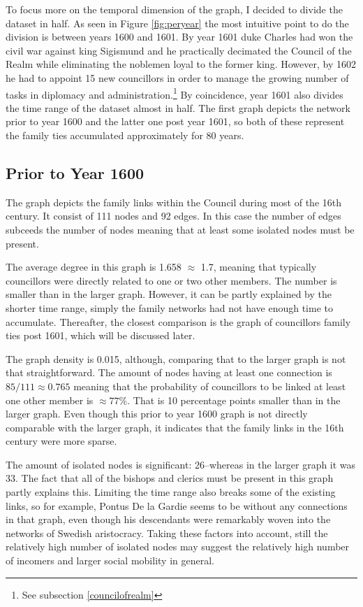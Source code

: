 To focus more on the temporal dimension of the graph, I decided to divide the dataset in half. As seen in Figure \ref{fig:peryear} the most intuitive point to do the division is between years 1600 and 1601. By year 1601 duke Charles had won the civil war against king Sigismund and he practically decimated the Council of the Realm while eliminating the noblemen loyal to the former king. However, by 1602 he had to appoint 15 new councillors in order to manage the growing number of tasks in diplomacy and administration.\footnote{See subsection \ref{councilofrealm}} By coincidence, year 1601 also divides the time range of the dataset almost in half. The first graph depicts the network prior to year 1600 and the latter one post year 1601, so both of these represent the family ties accumulated approximately for 80 years.

\subsection{Prior to Year 1600}
The graph depicts the family links within the Council during most of the 16th century. It consist of 111 nodes and 92 edges. In this case the number of edges subceeds the number of nodes meaning that at least some isolated nodes must be present. 

The average degree in this graph is 1.658 $\approx$ 1.7, meaning that typically councillors were directly related to one or two other members. The number is smaller than in the larger graph. However, it can be partly explained by the shorter time range, simply the family networks had not have enough time to accumulate. Thereafter, the closest comparison is the graph of councillors family ties post 1601, which will be discussed later.

The graph density is 0.015, although, comparing that to the larger graph is not that straightforward. The amount of nodes having at least one connection is $85/111 \approx 0.765$ meaning that the probability of councillors to be linked at least one other member is $\approx 77\%$. That is 10 percentage points smaller than in the larger graph. Even though this prior to year 1600 graph is not directly comparable with the larger graph, it indicates that the family links in the 16th century were more sparse.

The amount of isolated nodes is significant: 26–whereas in the larger graph it was 33. The fact that all of the bishops and clerics must be present in this graph partly explains this. Limiting the time range also breaks some of the existing links, so for example, Pontus De la Gardie seems to be without any connections in that graph, even though his descendants were remarkably woven into the networks of Swedish aristocracy. Taking these factors into account, still the relatively high number of isolated nodes may suggest the relatively high number of incomers and larger social mobility in general.


